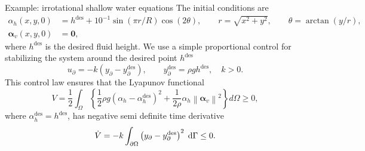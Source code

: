 \documentclass[aspectratio=169]{ISAE-Beamer}
\newcommand*{\norm}[1]{\ensuremath{\left\|#1\right\|}}
\begin{document}
\begin{frame}{Example: irrotational shallow water equations}
	The initial conditions are
	\begin{equation*}
	\begin{aligned}
	\alpha_h(x, y, 0) &= h^{\text{des}} + 10^{-1} \sin(\pi r/R) \cos(2 \theta), \qquad r = \sqrt{x^2 + y^2}, \qquad \theta = \arctan(y/r), \\
	\bm\alpha_v(x, y, 0) &= \bm{0},
	\end{aligned}
	\end{equation*}
	where $ h^{\text{des}}$ is the desired fluid height. We use a simple proportional control for stabilizing the system around the desired point $h^{\text{des}}$
	\begin{equation*}
	u_\partial = -k (y_\partial - y_\partial^{\text{des}}), \qquad y_\partial^{\text{des}}= \rho g h^{\text{des}}, \quad k>0.
	\end{equation*}
	This control law ensures that the Lyapunov functional
	\begin{equation*}
	V = \frac{1}{2} \int_{\Omega}\left\{\frac{1}{2} \rho g (\alpha_h - \alpha_h^{\text{des}})^2 + \frac{1}{2\rho} \alpha_h \norm{\bm{\alpha}_v}^2 \right\} d\Omega \ge 0,
	\end{equation*}
	where $\alpha_h^{\text{des}}=h^{\text{des}}$, has negative semi definite time derivative
	\begin{equation*}
	\dot{V} = -k \int_{\partial \Omega}\left({y}_\partial - {y}_\partial^{\text{des}} \right)^2 \d{\Gamma} \le 0.
	\end{equation*}
\end{frame}
\end{document}
